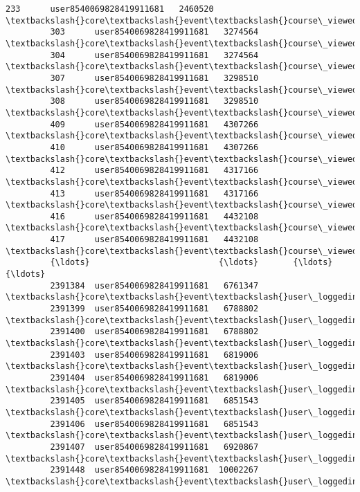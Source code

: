 \documentclass[11pt]{article}
\begin{document}
\begin{Verbatim}[commandchars=\\\{\}]
         233      user8540069828419911681   2460520    \textbackslash{}core\textbackslash{}event\textbackslash{}course\_viewed   
         303      user8540069828419911681   3274564    \textbackslash{}core\textbackslash{}event\textbackslash{}course\_viewed   
         304      user8540069828419911681   3274564    \textbackslash{}core\textbackslash{}event\textbackslash{}course\_viewed   
         307      user8540069828419911681   3298510    \textbackslash{}core\textbackslash{}event\textbackslash{}course\_viewed   
         308      user8540069828419911681   3298510    \textbackslash{}core\textbackslash{}event\textbackslash{}course\_viewed   
         409      user8540069828419911681   4307266    \textbackslash{}core\textbackslash{}event\textbackslash{}course\_viewed   
         410      user8540069828419911681   4307266    \textbackslash{}core\textbackslash{}event\textbackslash{}course\_viewed   
         412      user8540069828419911681   4317166    \textbackslash{}core\textbackslash{}event\textbackslash{}course\_viewed   
         413      user8540069828419911681   4317166    \textbackslash{}core\textbackslash{}event\textbackslash{}course\_viewed   
         416      user8540069828419911681   4432108    \textbackslash{}core\textbackslash{}event\textbackslash{}course\_viewed   
         417      user8540069828419911681   4432108    \textbackslash{}core\textbackslash{}event\textbackslash{}course\_viewed   
         {\ldots}                          {\ldots}       {\ldots}                          {\ldots}   
         2391384  user8540069828419911681   6761347  \textbackslash{}core\textbackslash{}event\textbackslash{}user\_loggedinas   
         2391399  user8540069828419911681   6788802  \textbackslash{}core\textbackslash{}event\textbackslash{}user\_loggedinas   
         2391400  user8540069828419911681   6788802  \textbackslash{}core\textbackslash{}event\textbackslash{}user\_loggedinas   
         2391403  user8540069828419911681   6819006  \textbackslash{}core\textbackslash{}event\textbackslash{}user\_loggedinas   
         2391404  user8540069828419911681   6819006  \textbackslash{}core\textbackslash{}event\textbackslash{}user\_loggedinas   
         2391405  user8540069828419911681   6851543  \textbackslash{}core\textbackslash{}event\textbackslash{}user\_loggedinas   
         2391406  user8540069828419911681   6851543  \textbackslash{}core\textbackslash{}event\textbackslash{}user\_loggedinas   
         2391407  user8540069828419911681   6920867  \textbackslash{}core\textbackslash{}event\textbackslash{}user\_loggedinas   
         2391448  user8540069828419911681  10002267  \textbackslash{}core\textbackslash{}event\textbackslash{}user\_loggedinas   

\end{Verbatim}
\end{document}
